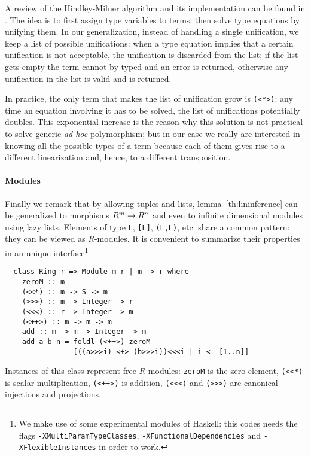 A review of the Hindley-Milner algorithm and its implementation can be
found in \cite{Cardelli:Typechecking}. The idea is to first assign
type variables to terms, then solve type equations by unifying them.
In our generalization, instead of handling a single unification, we
keep a list of possible unifications: when a type equation implies
that a certain unification is not acceptable, the unification is
discarded from the list; if the list gets empty the term cannot by
typed and an error is returned, otherwise any unification in the list
is valid and is returned.

In practice, the only term that makes the list of unification grow is
\lstinline{(<*>)}: any time an equation involving it has to be solved,
the list of unifications potentially doubles. This exponential
increase is the reason why this solution is not practical to solve
generic \emph{ad-hoc} polymorphism; but in our case we really are
interested in knowing all the possible types of a term because each of
them gives rise to a different linearization and, hence, to a
different transposition.

\paragraph{Modules}
\label{sec:modules}
Finally we remark that by allowing tuples and lists,
lemma~\ref{th:lininference} can be generalized to morphisms $R^m\rightarrow
R^n$ and even to infinite dimensional modules using lazy
lists. Elements of type \lstinline{L}, \lstinline{[L]},
\lstinline{(L,L)}, etc. share a common pattern: they can be viewed as
$R$-modules. It is convenient to summarize their properties in an
unique interface\footnote{We make use of some experimental modules of
  Haskell: this codes needs the flags
  \lstinline{-XMultiParamTypeClasses},
  \lstinline{-XFunctionalDependencies} and
  \lstinline{-XFlexibleInstances} in order to work.}
\begin{lstlisting}
  class Ring r => Module m r | m -> r where
    zeroM :: m
    (<<*) :: m -> S -> m
    (>>>) :: m -> Integer -> r
    (<<<) :: r -> Integer -> m
    (<++>) :: m -> m -> m
    add :: m -> m -> Integer -> m
    add a b n = foldl (<++>) zeroM
                [((a>>>i) <+> (b>>>i))<<<i | i <- [1..n]]
\end{lstlisting}

Instances of this class represent free $R$-modules: \lstinline{zeroM}
is the zero element, \lstinline{(<<*)} is scalar multiplication,
\lstinline{(<++>)} is addition, \lstinline{(<<<)} and
\lstinline{(>>>)} are canonical injections and projections.

